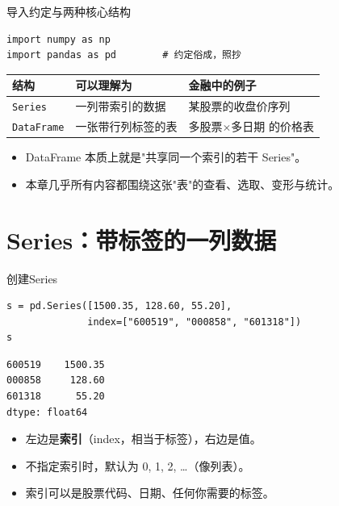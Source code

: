 \documentclass[9pt]{ctexbeamer}
\begin{document}
\begin{frame}[fragile]{导入约定与两种核心结构}
	\begin{lstlisting}
import numpy as np
import pandas as pd        # 约定俗成，照抄
\end{lstlisting}
	\begin{table}
		\centering
		\begin{tabular}{lll}
			\toprule
			结构 & 可以理解为 & 金融中的例子 \\
			\midrule
			\texttt{Series} & 一列带索引的数据 & 某股票的收盘价序列 \\
			\texttt{DataFrame} & 一张带行列标签的表 & 多股票$\times$多日期 的价格表 \\
			\bottomrule
		\end{tabular}
	\end{table}
	\begin{itemize}
		\item DataFrame 本质上就是"共享同一个索引的若干 Series"。
		\item 本章几乎所有内容都围绕这张"表"的查看、选取、变形与统计。
	\end{itemize}
\end{frame}


\section{Series：带标签的一列数据}

\begin{frame}[fragile]{创建Series}
	\begin{lstlisting}
s = pd.Series([1500.35, 128.60, 55.20],
              index=["600519", "000858", "601318"])
s
\end{lstlisting}
	\begin{lstlisting}
600519    1500.35
000858     128.60
601318      55.20
dtype: float64
\end{lstlisting}
	\begin{itemize}
		\item 左边是\textbf{索引}（index，相当于标签），右边是值。
		\item 不指定索引时，默认为 0, 1, 2, \ldots（像列表）。
		\item 索引可以是股票代码、日期、任何你需要的标签。
	\end{itemize}
\end{frame}
\end{document}
